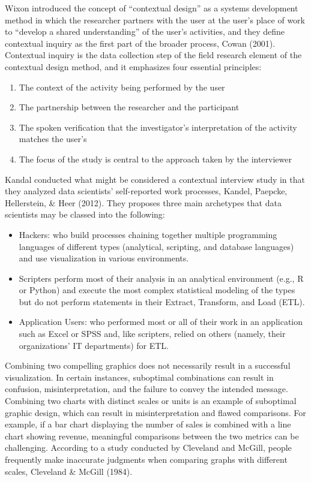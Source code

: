 \documentclass[print]{nuthesis}
\begin{document}
Wixon introduced the concept of ``contextual design'' as a systems development method in which the researcher partners with the user at the user's place of work to ``develop a shared understanding'' of the user's activities, and they define contextual inquiry as the first part of the broader process, Cowan (2001).
Contextual inquiry is the data collection step of the field research element of the contextual design method, and it emphasizes four essential principles:

\begin{enumerate}
\def\labelenumi{\arabic{enumi}.}
\item
  The context of the activity being performed by the user
\item
  The partnership between the researcher and the participant
\item
  The spoken verification that the investigator's interpretation of the activity matches the user's
\item
  The focus of the study is central to the approach taken by the interviewer
\end{enumerate}

Kandal conducted what might be considered a contextual interview study in that they analyzed data scientists' self-reported work processes, Kandel, Paepcke, Hellerstein, \& Heer (2012).
They proposes three main archetypes that data scientists may be classed into the following:

\begin{itemize}
\item
  Hackers: who build processes chaining together multiple programming languages of different types (analytical, scripting, and database languages) and use visualization in various environments.
\item
  Scripters perform most of their analysis in an analytical environment (e.g., R or Python) and execute the most complex statistical modeling of the types but do not perform statements in their Extract, Transform, and Load (ETL).
\item
  Application Users: who performed most or all of their work in an application such as Excel or SPSS and, like scripters, relied on others (namely, their organizations' IT departments) for ETL.
\end{itemize}

Combining two compelling graphics does not necessarily result in a successful visualization.
In certain instances, suboptimal combinations can result in confusion, misinterpretation, and the failure to convey the intended message.
Combining two charts with distinct scales or units is an example of suboptimal graphic design, which can result in misinterpretation and flawed comparisons.
For example, if a bar chart displaying the number of sales is combined with a line chart showing revenue, meaningful comparisons between the two metrics can be challenging.
According to a study conducted by Cleveland and McGill, people frequently make inaccurate judgments when comparing graphs with different scales, Cleveland \& McGill (1984).
\end{document}
